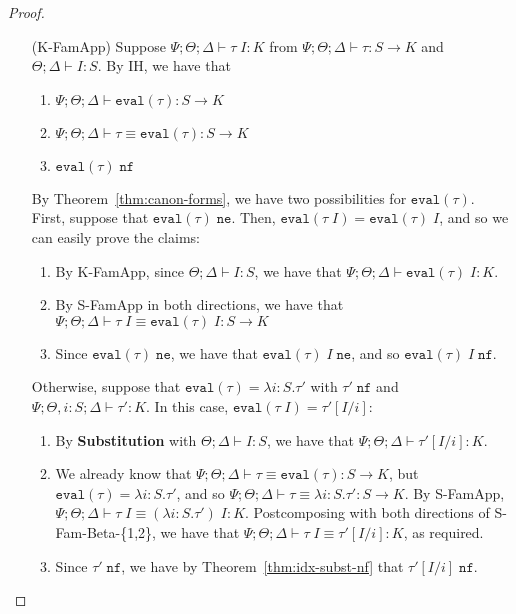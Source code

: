 \begin{proof}
\begin{enumerate}
  \item[(K-FamApp)] Suppose ${\Psi ; \Theta ; \Delta \vdash \tau \; I : K}$ from $\Psi ; \Theta ; \Delta \vdash \tau : S \to K$ and  $\Theta ; \Delta \vdash I : S$. By IH,
  we have that
  \begin{enumerate}[1.]
   \item $\Psi ; \Theta ; \Delta \vdash \texttt{eval}(\tau) : S \to K$
   \item $\Psi ; \Theta ; \Delta \vdash \tau \equiv \texttt{eval}(\tau) : S \to K$
   \item $\texttt{eval}(\tau) \; \texttt{nf}$
  \end{enumerate}
  By Theorem~\ref{thm:canon-forms}, we have two possibilities for $\texttt{eval}(\tau)$. First, suppose that  $\texttt{eval}(\tau) \; \texttt{ne}$. Then, $\texttt{eval}(\tau \; I) = \texttt{eval}(\tau) \; I$, and so we can easily prove the claims:
  \begin{enumerate}[1.]
   \item By K-FamApp, since $\Theta ; \Delta \vdash I : S$, we have that $\Psi ; \Theta ; \Delta \vdash \texttt{eval}(\tau) \; I : K$.
   \item By S-FamApp in both directions, we have that $\Psi ; \Theta ; \Delta \vdash \tau \; I \equiv \texttt{eval}(\tau) \; I : S \to K$
   \item Since $\texttt{eval}(\tau) \; \texttt{ne}$, we have that $\texttt{eval}(\tau) \; I \; \texttt{ne}$, and so $\texttt{eval}(\tau) \; I \; \texttt{nf}$.
  \end{enumerate}
  Otherwise, suppose that $\texttt{eval}(\tau) = \lambda i : S. \tau'$ with $\tau' \; \texttt{nf}$ and $\Psi ; \Theta , i : S ; \Delta \vdash \tau' : K$. In this case, $\texttt{eval}(\tau \; I) = \tau'[I/i]$:
  \begin{enumerate}[1.]
   \item By \textbf{Substitution} with $\Theta ; \Delta \vdash I : S$, we have that $\Psi ; \Theta ; \Delta \vdash \tau'[I/i] : K$.
   \item We already know that $\Psi ; \Theta ; \Delta \vdash \tau \equiv \texttt{eval}(\tau) : S \to K$, but $\texttt{eval}(\tau) = \lambda i : S. \tau'$, and so
   $\Psi ; \Theta ; \Delta \vdash \tau \equiv \lambda i : S.\tau' : S \to K$. By S-FamApp, $\Psi ; \Theta ; \Delta \vdash \tau \; I \equiv (\lambda i : S.\tau') \; I : K$. Postcomposing with both directions of S-Fam-Beta-\{1,2\}, we have that $\Psi ; \Theta ; \Delta \vdash \tau \; I \equiv \tau'[I/i] : K$, as required.
   \item Since $\tau'\; \texttt{nf}$, we have by Theorem~\ref{thm:idx-subst-nf} that $\tau'[I/i] \; \texttt{nf}$.
  \end{enumerate}
  
\end{enumerate}
\end{proof}